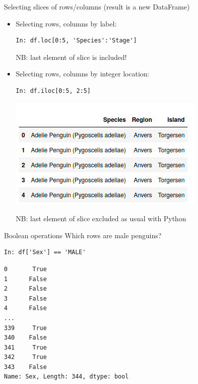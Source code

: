 \documentclass[aspectratio=169,usenames,dvipsnames]{beamer}
\begin{document}
\begin{frame}[fragile]{Selecting slices of rows/columns (result is a new DataFrame)}
    \begin{itemize}
        \item Selecting rows, columns by label:
\begin{lstlisting}
In: df.loc[0:5, 'Species':'Stage']
\end{lstlisting}

            NB: last element of slice is included!

        \item Selecting rows, columns by integer location:
\begin{lstlisting}
In: df.iloc[0:5, 2:5]
\end{lstlisting}

\vspace{-1em}
\includegraphics[height=0.4\textheight]{fig/penguinslice}

			NB: last element of slice excluded as usual with Python
    \end{itemize}

\end{frame}

\begin{frame}[fragile]{Boolean operations}
Which rows are male penguins?

\begin{lstlisting}
In: df['Sex'] == 'MALE'
\end{lstlisting}\vspace{-1em}\begin{lstlisting}[style=plain]
0       True
1      False
2      False
3      False
4      False
...  
339     True
340    False
341     True
342     True
343    False
Name: Sex, Length: 344, dtype: bool
\end{lstlisting}
\end{frame}
\end{document}
